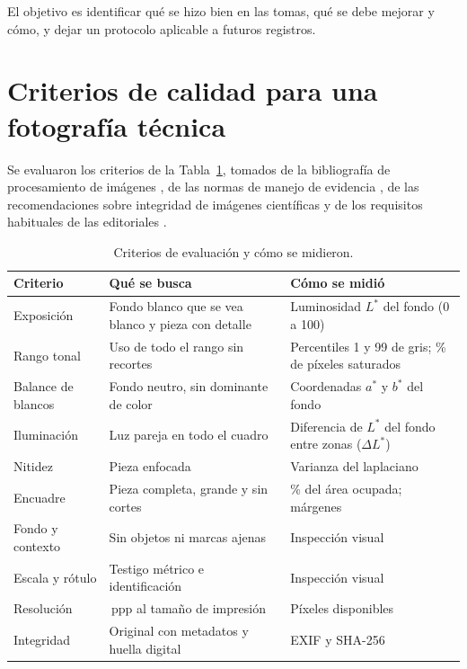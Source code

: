 \documentclass[runningheads]{llncs}
\begin{document}
El objetivo es identificar qué se hizo bien en las tomas, qué se debe mejorar y cómo, y dejar un protocolo aplicable a futuros registros.

\section{Criterios de calidad para una fotografía técnica}

Se evaluaron los criterios de la Tabla~\ref{tab:criterios}, tomados de la bibliografía de procesamiento de imágenes \cite{gonzalez}, de las normas de manejo de evidencia \cite{astm860}, de las recomendaciones sobre integridad de imágenes científicas \cite{rossner} y de los requisitos habituales de las editoriales \cite{allen}.

\begin{table}
\caption{Criterios de evaluación y cómo se midieron.}\label{tab:criterios}
\centering
\begin{tabular}{>{\raggedright\arraybackslash}p{2.4cm}>{\raggedright\arraybackslash}p{4.3cm}>{\raggedright\arraybackslash}p{4.3cm}}
\toprule
\textbf{Criterio} & \textbf{Qué se busca} & \textbf{Cómo se midió}\\
\midrule
Exposición & Fondo blanco que se vea blanco y pieza con detalle & Luminosidad $L^*$ del fondo (0 a 100)\\
Rango tonal & Uso de todo el rango sin recortes & Percentiles 1 y 99 de gris; \% de píxeles saturados\\
Balance de blancos & Fondo neutro, sin dominante de color & Coordenadas $a^*$ y $b^*$ del fondo\\
Iluminación & Luz pareja en todo el cuadro & Diferencia de $L^*$ del fondo entre zonas ($\Delta L^*$)\\
Nitidez & Pieza enfocada & Varianza del laplaciano\\
Encuadre & Pieza completa, grande y sin cortes & \% del área ocupada; márgenes\\
Fondo y contexto & Sin objetos ni marcas ajenas & Inspección visual\\
Escala y rótulo & Testigo métrico e identificación & Inspección visual\\
Resolución & 300\,ppp al tamaño de impresión & Píxeles disponibles\\
Integridad & Original con metadatos y huella digital & EXIF y SHA-256\\
\bottomrule
\end{tabular}
\end{table}
\end{document}

